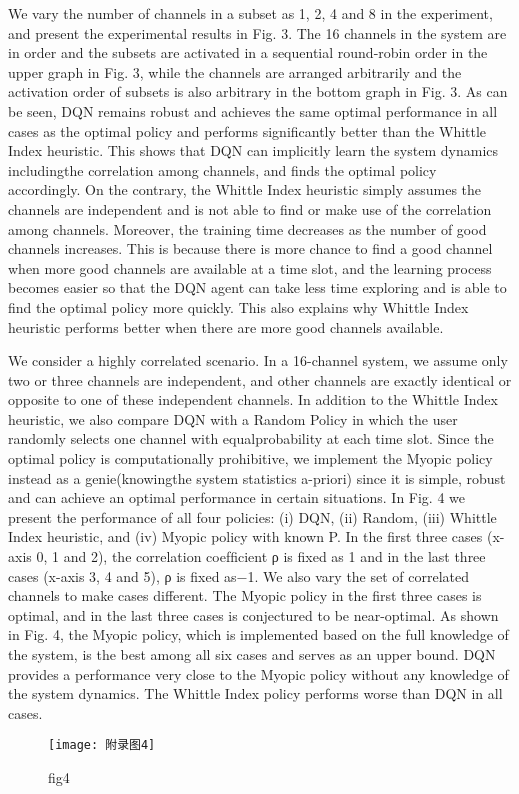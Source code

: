 We vary the number of channels in a subset as 1, 2, 4 and 8 in the experiment, and present the experimental results in Fig. 3. The 16 channels in the system are in order and the subsets are activated in a sequential round-robin order in the upper graph in Fig. 3, while the channels are arranged arbitrarily and the activation order of subsets is also arbitrary in the bottom graph in Fig. 3. As can be seen, DQN remains robust and achieves the same optimal performance in all cases as the optimal policy and performs signiﬁcantly better than the Whittle Index heuristic. This shows that DQN can implicitly learn the system dynamics includingthe correlation among channels, and ﬁnds the optimal policy accordingly. On the contrary, the Whittle Index heuristic simply assumes the channels are independent and is not able to ﬁnd or make use of the correlation among channels. Moreover, the training time decreases as the number of good channels increases. This is because there is more chance to ﬁnd a good channel when more good channels are available at a time slot, and the learning process becomes easier so that the DQN agent can take less time exploring and is able to ﬁnd the optimal policy more quickly. This also explains why Whittle Index heuristic performs better when there are more good channels available.

We consider a highly correlated scenario. In a 16-channel system, we assume only two or three channels are independent, and other channels are exactly identical or opposite to one of these independent channels. In addition to the Whittle Index heuristic, we also compare DQN with a Random Policy in which the user randomly selects one channel with equalprobability at each time slot. Since the optimal policy is computationally prohibitive, we implement the Myopic policy instead as a genie(knowingthe system statistics a-priori) since it is simple, robust and can achieve an optimal performance in certain situations. In Fig. 4 we present the performance of all four policies: (i) DQN, (ii) Random, (iii) Whittle Index heuristic, and (iv) Myopic policy with known P. In the ﬁrst three cases (x-axis 0, 1 and 2), the correlation coefﬁcient ρ is ﬁxed as 1 and in the last three cases (x-axis 3, 4 and 5), ρ is ﬁxed as−1. We also vary the set of correlated channels to make cases different. The Myopic policy in the ﬁrst three cases is optimal, and in the last three cases is conjectured to be near-optimal. As shown in Fig. 4, the Myopic policy, which is implemented based on the full knowledge of the system, is the best among all six cases and serves as an upper bound. DQN provides a performance very close to the Myopic policy without any knowledge of the system dynamics. The Whittle Index policy performs worse than DQN in all cases.
\begin{figure}[h]
	\centering
	\texttt{[image: 附录图4]}
	\caption{fig4}
\end{figure}
